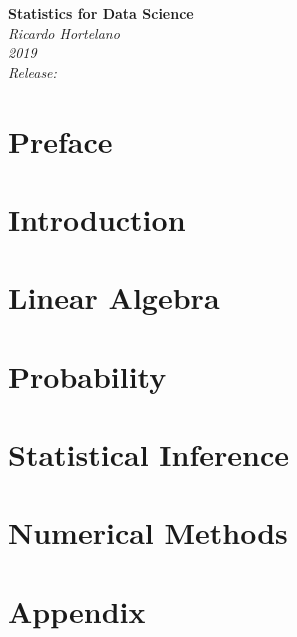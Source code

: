 \documentclass[12pt]{book}
\begin{document}
\begin{titlepage}
    \begin{center}
       \Large\textbf{Statistics for Data Science}\\
       \large\textit{Ricardo Hortelano}\\
       \textit{2019}\\
       \vspace*{3\baselineskip}
       \textit{Release:}\\
       \textit{}
    \end{center}
 \end{titlepage}

\listoftodos
\tableofcontents

\chapter*{Preface}


\chapter*{Introduction}


\chapter{Linear Algebra}


\chapter{Probability}


\chapter{Statistical Inference}


\chapter{Numerical Methods}


\appendix
\chapter{Appendix}


\printbibliography
\end{document}
